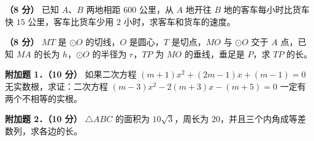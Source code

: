 \begin{question}
\textbf{（8 分）} 已知 $A\text{、}B$ 两地相距 $600$ 公里，从 $A$ 地开往 $B$ 地的客车每小时比货车快 $15$ 公里，客车比货车少用 $2$ 小时，求客车和货车的速度。

\Needspace{0.4\textheight}
\end{question}
\begin{question}
\textbf{（8 分）} $MT$ 是 $\odot O$ 的切线，$O$ 是圆心，$T$ 是切点，$MO$ 与 $\odot O$ 交于 $A$ 点，已知 $MA$ 的长为 $h$，$\odot O$ 的半径为 $r$，$TP$ 为 $MO$ 的垂线，垂足是 $P$，求 $TP$ 的长。
\nopagebreak[4]
\begin{center}\end{center}
\nopagebreak[4]
\textbf{附加题 1．（10 分）} 如果二次方程 $(m+1)x^2+(2m-1)x+(m-1)=0$ 无实数根，求证：二次方程 $(m-3)x^2-2(m+3)x-(m+5)=0$ 一定有两个不相等的实根。

\textbf{附加题 2．（10 分）} $\triangle ABC$ 的面积为 $10\sqrt3$，周长为 $20$，并且三个内角成等差数列，求各边的长。

\end{question}